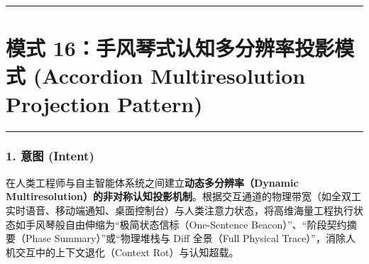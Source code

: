 \begin{Shaded}
\begin{Highlighting}[]
    \OperatorTok{:}\OperatorTok{=}\NormalTok{ \{}
\OperatorTok{:} \SpecialCharTok{$\{}\NormalTok{()}\SpecialCharTok{\}}\VerbatimStringTok{\textasciigrave{}}\OperatorTok{,}
\OperatorTok{:} \OperatorTok{,}
\OperatorTok{:} 
\NormalTok{    \}}\OperatorTok{;}
     \OperatorTok{;}

    \NormalTok{ \{}
\OperatorTok{:} \OperatorTok{,}
\OperatorTok{:}\OperatorTok{,}
\OperatorTok{:} 
\NormalTok{    \}}\OperatorTok{;}
\NormalTok{  \}}
\NormalTok{\}}
\end{Highlighting}
\end{Shaded}

\begin{center}\rule{0.5\linewidth}{0.5pt}\end{center}

\section{模式 16：手风琴式认知多分辨率投影模式 (Accordion
Multiresolution Projection
Pattern)}\label{ux6a21ux5f0f-16ux624bux98ceux7434ux5f0fux8ba4ux77e5ux591aux5206ux8fa8ux7387ux6295ux5f71ux6a21ux5f0f-accordion-multiresolution-projection-pattern}

\begin{center}\rule{0.5\linewidth}{0.5pt}\end{center}

\subsubsection{1. 意图 (Intent)}\label{ux610fux56fe-intent-15}

在人类工程师与自主智能体系统之间建立\textbf{动态多分辨率（Dynamic
Multiresolution）的非对称认知投影机制}。根据交互通道的物理带宽（如全双工实时语音、移动端通知、桌面控制台）与人类注意力状态，将高维海量工程执行状态如手风琴般自由伸缩为``极简状态信标（One-Sentence
Beacon）''、``阶段契约摘要（Phase Summary）''或``物理堆栈与 Diff
全景（Full Physical Trace）''，消除人机交互中的上下文退化（Context
Rot）与认知超载。

